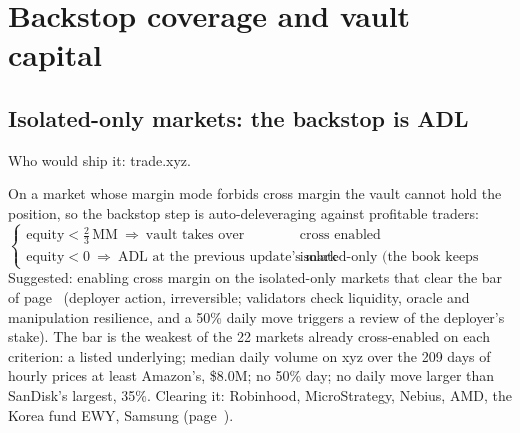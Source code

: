 \documentclass[10.5pt,a4paper]{article}
\begin{document}
\section{Backstop coverage and vault capital}\label{sec:cover}
\subsection{Isolated-only markets: the backstop is ADL}
\par{\small\color{mute}Who would ship it: trade.xyz.}\par
On a market whose margin mode forbids cross margin the vault cannot hold the position, so the backstop step is auto-deleveraging against profitable traders:
\begin{equation}
\begin{cases}\text{equity} < \tfrac23\,\text{MM}\ \Rightarrow\ \text{vault takes over} & \text{cross enabled}\\ \text{equity} < 0\ \Rightarrow\ \text{ADL at the previous update's mark} & \text{isolated-only (the book keeps selling until then)}\end{cases}
\end{equation}
Suggested: enabling cross margin on the isolated-only markets that clear the bar of page~\pageref{sec:five} (deployer action, irreversible; validators check liquidity, oracle and manipulation resilience, and a 50\% daily move triggers a review of the deployer's stake). The bar is the weakest of the 22 markets already cross-enabled on each criterion: a listed underlying; median daily volume on xyz over the 209 days of hourly prices at least Amazon's, \$8.0M; no 50\% day; no daily move larger than SanDisk's largest, 35\%. Clearing it: Robinhood, MicroStrategy, Nebius, AMD, the Korea fund EWY, Samsung (page~\pageref{sec:five}).
\end{document}
